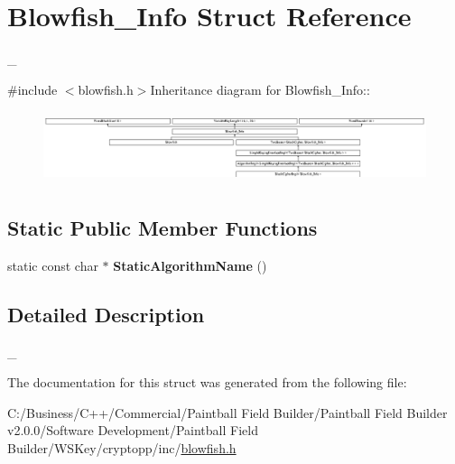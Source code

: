 \hypertarget{struct_blowfish___info}{
\section{Blowfish\_\-Info Struct Reference}
\label{struct_blowfish___info}
}


\_\-  


{\ttfamily \#include $<$blowfish.h$>$}Inheritance diagram for Blowfish\_\-Info::\begin{figure}[H]
\begin{center}
\leavevmode
\includegraphics[height=2.13333cm]{struct_blowfish___info}
\end{center}
\end{figure}
\subsection*{Static Public Member Functions}
\begin{DoxyCompactItemize}
\item 
\hypertarget{struct_blowfish___info_aa83d39bbf3797cdfcc05c4c0ef12e3c9}{
static const char $\ast$ {\bfseries StaticAlgorithmName} ()}
\label{struct_blowfish___info_aa83d39bbf3797cdfcc05c4c0ef12e3c9}

\end{DoxyCompactItemize}


\subsection{Detailed Description}
\_\- 

The documentation for this struct was generated from the following file:\begin{DoxyCompactItemize}
\item 
C:/Business/C++/Commercial/Paintball Field Builder/Paintball Field Builder v2.0.0/Software Development/Paintball Field Builder/WSKey/cryptopp/inc/\hyperlink{blowfish_8h}{blowfish.h}\end{DoxyCompactItemize}
